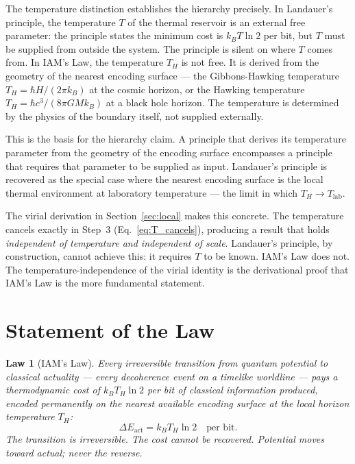 \documentclass[12pt,a4paper]{article}
\newtheorem{law}{Law}
\begin{document}
The temperature distinction establishes the hierarchy precisely.
In Landauer's principle, the temperature $T$ of the thermal reservoir
is an external free parameter: the principle states the minimum cost
is $k_B T \ln 2$ per bit, but $T$ must be supplied from outside the
system. The principle is silent on where $T$ comes from. In IAM's Law,
the temperature $T_H$ is not free. It is derived from the geometry of
the nearest encoding surface --- the Gibbons-Hawking temperature
$T_H = \hbar H / (2\pi k_B)$ at the cosmic horizon, or the Hawking
temperature $T_H = \hbar c^3 / (8\pi G M k_B)$ at a black hole
horizon. The temperature is determined by the physics of the boundary
itself, not supplied externally.

This is the basis for the hierarchy claim. A principle that derives
its temperature parameter from the geometry of the encoding surface
encompasses a principle that requires that parameter to be supplied
as input. Landauer's principle is recovered as the special case where
the nearest encoding surface is the local thermal environment at
laboratory temperature --- the limit in which $T_H \to T_\mathrm{lab}$.

The virial derivation in Section~\ref{sec:local} makes this concrete.
The temperature cancels exactly in Step~3 (Eq.~\eqref{eq:T_cancels}),
producing a result that holds \textit{independent of temperature and
independent of scale}. Landauer's principle, by construction, cannot
achieve this: it requires $T$ to be known. IAM's Law does not. The
temperature-independence of the virial identity is the derivational
proof that IAM's Law is the more fundamental statement.

\section{Statement of the Law}
\label{sec:statement}

\begin{mdframed}
\begin{law}[IAM's Law]
\label{law:iam}
Every irreversible transition from quantum potential to classical
actuality --- every decoherence event on a timelike worldline ---
pays a thermodynamic cost of $k_B T_H \ln 2$ per bit of classical
information produced, encoded permanently on the nearest available
encoding surface at the local horizon temperature $T_H$:
\begin{equation}
\Delta E_\mathrm{act} = k_B T_H \ln 2 \quad \text{per bit.}
\label{eq:iams_law}
\end{equation}
The transition is irreversible. The cost cannot be recovered.
Potential moves toward actual; never the reverse.
\end{law}
\end{mdframed}
\end{document}
